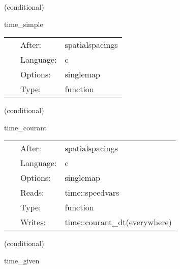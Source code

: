 \documentclass{article}
\begin{document}
\vspace{5mm}

   (conditional) 

\hspace{5mm} time\_simple 

\hspace{5mm}{\it set timestep based on courant condition (courant\_time) } 


\hspace{5mm}

 \begin{tabular*}{160mm}{cll} 
~ & After:  & spatialspacings \\ 
~ & Language:  & c \\ 
~ & Options:  & singlemap \\ 
~ & Type:  & function \\ 
\end{tabular*} 


\vspace{5mm}

   (conditional) 

\hspace{5mm} time\_courant 

\hspace{5mm}{\it reset timestep each iteration } 


\hspace{5mm}

 \begin{tabular*}{160mm}{cll} 
~ & After:  & spatialspacings \\ 
~ & Language:  & c \\ 
~ & Options:  & singlemap \\ 
~ & Reads:  & time::speedvars \\ 
~ & Type:  & function \\ 
~ & Writes:  & time::courant\_dt(everywhere) \\ 
\end{tabular*} 


\vspace{5mm}

   (conditional) 

\hspace{5mm} time\_given 

\hspace{5mm}{\it set fixed timestep } 


\hspace{5mm}
\end{document}
